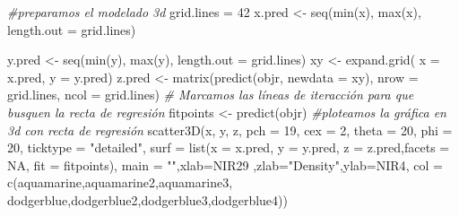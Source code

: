 \documentclass[
]{article}
\newenvironment{Shaded}{\begin{snugshade}}{\end{snugshade}}
\newcommand{\AttributeTok}[1]{\textcolor[rgb]{0.77,0.63,0.00}{#1}}
\newcommand{\CommentTok}[1]{\textcolor[rgb]{0.56,0.35,0.01}{\textit{#1}}}
\newcommand{\ConstantTok}[1]{\textcolor[rgb]{0.00,0.00,0.00}{#1}}
\newcommand{\DecValTok}[1]{\textcolor[rgb]{0.00,0.00,0.81}{#1}}
\newcommand{\FunctionTok}[1]{\textcolor[rgb]{0.00,0.00,0.00}{#1}}
\newcommand{\NormalTok}[1]{#1}
\newcommand{\OtherTok}[1]{\textcolor[rgb]{0.56,0.35,0.01}{#1}}
\newcommand{\StringTok}[1]{\textcolor[rgb]{0.31,0.60,0.02}{#1}}
\begin{document}
\begin{Shaded}
\begin{Highlighting}[]
\CommentTok{\#preparamos el modelado 3d}
\NormalTok{grid.lines }\OtherTok{=} \DecValTok{42}
\NormalTok{x.pred }\OtherTok{\textless{}{-}} \FunctionTok{seq}\NormalTok{(}\FunctionTok{min}\NormalTok{(x), }\FunctionTok{max}\NormalTok{(x), }\AttributeTok{length.out =}\NormalTok{ grid.lines)}


\NormalTok{y.pred }\OtherTok{\textless{}{-}} \FunctionTok{seq}\NormalTok{(}\FunctionTok{min}\NormalTok{(y), }\FunctionTok{max}\NormalTok{(y), }\AttributeTok{length.out =}\NormalTok{ grid.lines)}
\NormalTok{xy }\OtherTok{\textless{}{-}} \FunctionTok{expand.grid}\NormalTok{( }\AttributeTok{x =}\NormalTok{ x.pred, }\AttributeTok{y =}\NormalTok{ y.pred)}
\NormalTok{z.pred }\OtherTok{\textless{}{-}} \FunctionTok{matrix}\NormalTok{(}\FunctionTok{predict}\NormalTok{(objr, }\AttributeTok{newdata =}\NormalTok{ xy), }
                 \AttributeTok{nrow =}\NormalTok{ grid.lines, }\AttributeTok{ncol =}\NormalTok{ grid.lines)}
\CommentTok{\# Marcamos las líneas de iteracción para que busquen la recta de regresión}
\NormalTok{fitpoints }\OtherTok{\textless{}{-}} \FunctionTok{predict}\NormalTok{(objr)}
\CommentTok{\#ploteamos la gráfica en 3d con recta de regresión}
\FunctionTok{scatter3D}\NormalTok{(x, y, z, }\AttributeTok{pch =} \DecValTok{19}\NormalTok{, }\AttributeTok{cex =} \DecValTok{2}\NormalTok{, }
\AttributeTok{theta =} \DecValTok{20}\NormalTok{, }\AttributeTok{phi =} \DecValTok{20}\NormalTok{, }\AttributeTok{ticktype =} \StringTok{"detailed"}\NormalTok{,}
\AttributeTok{surf =} \FunctionTok{list}\NormalTok{(}\AttributeTok{x =}\NormalTok{ x.pred, }\AttributeTok{y =}\NormalTok{ y.pred, }\AttributeTok{z =}\NormalTok{ z.pred,}\AttributeTok{facets =} \ConstantTok{NA}\NormalTok{, }\AttributeTok{fit =}\NormalTok{ fitpoints), }
\AttributeTok{main =} \StringTok{""}\NormalTok{,}\AttributeTok{xlab=}\StringTok{\textquotesingle{}NIR29 \textquotesingle{}}\NormalTok{,}\AttributeTok{zlab=}\StringTok{"Density"}\NormalTok{,}\AttributeTok{ylab=}\StringTok{\textquotesingle{}NIR4\textquotesingle{}}\NormalTok{, }
\AttributeTok{col =} \FunctionTok{c}\NormalTok{(}\StringTok{\textquotesingle{}aquamarine\textquotesingle{}}\NormalTok{,}\StringTok{\textquotesingle{}aquamarine2\textquotesingle{}}\NormalTok{,}\StringTok{\textquotesingle{}aquamarine3\textquotesingle{}}\NormalTok{,}
\StringTok{\textquotesingle{}dodgerblue\textquotesingle{}}\NormalTok{,}\StringTok{\textquotesingle{}dodgerblue2\textquotesingle{}}\NormalTok{,}\StringTok{\textquotesingle{}dodgerblue3\textquotesingle{}}\NormalTok{,}\StringTok{\textquotesingle{}dodgerblue4\textquotesingle{}}\NormalTok{))}
\end{Highlighting}
\end{Shaded}
\end{document}
